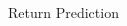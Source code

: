 \documentclass{beamer}
\begin{document}
\begin{frame}{Return Prediction}
	\vspace{-12pt}
	\begin{table}
		\begin{adjustbox}{width=\textwidth,height=4cm}
			
		\end{adjustbox}
		
	\end{table}
\end{frame}

%			
\end{document}
